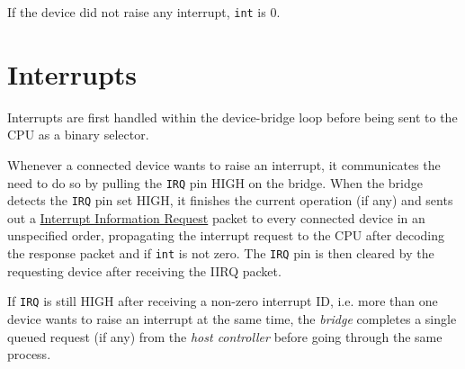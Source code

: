 \documentclass[a4paper,10pt]{article}
\begin{document}
If the device did not raise any interrupt, \verb|int| is 0.

\section{Interrupts}
Interrupts are first handled within the device-bridge loop before being sent to the CPU as a binary selector.

Whenever a connected device wants to raise an interrupt, it communicates the need to do so by pulling the \verb|IRQ| pin HIGH on the bridge. When the bridge detects the \verb|IRQ| pin set HIGH, it finishes the current operation (if any) and sents out a \hyperref[P:IIRQ]{Interrupt Information Request} packet to every connected device in an unspecified order, propagating the interrupt request to the CPU after decoding the response packet and if \verb|int| is not zero. The \verb|IRQ| pin is then cleared by the requesting device after receiving the IIRQ packet.

If \verb|IRQ| is still HIGH after receiving a non-zero interrupt ID, i.e. more than one device wants to raise an interrupt at the same time, the \emph{bridge} completes a single queued request (if any) from the \emph{host controller} before going through the same process.
\end{document}

